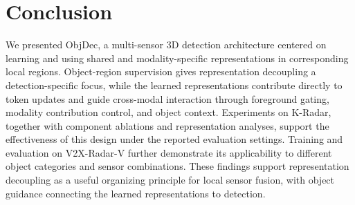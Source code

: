 \section{Conclusion}
\label{sec:conclusion}

We presented ObjDec, a multi-sensor 3D detection architecture centered on learning and using shared and modality-specific representations in corresponding local regions.
Object-region supervision gives representation decoupling a detection-specific focus, while the learned representations contribute directly to token updates and guide cross-modal interaction through foreground gating, modality contribution control, and object context.
Experiments on K-Radar, together with component ablations and representation analyses, support the effectiveness of this design under the reported evaluation settings.
Training and evaluation on V2X-Radar-V further demonstrate its applicability to different object categories and sensor combinations.
These findings support representation decoupling as a useful organizing principle for local sensor fusion, with object guidance connecting the learned representations to detection.
